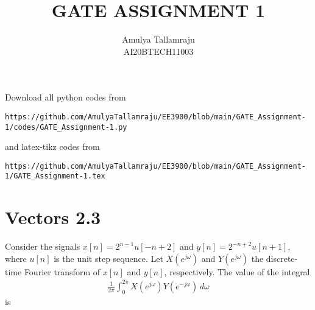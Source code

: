 \documentclass[journal,12pt,twocolumn]{IEEEtran}
\begin{document}
     \def\centbox#1{\makebox[0in]{#1}}
     \def\topbox#1{\raisebox{-\baselineskip}[0in][0in]{#1}}
     \def\midbox#1{\raisebox{-0.5\baselineskip}[0in][0in]{#1}}
\vspace{3cm}
\title{GATE ASSIGNMENT 1}
\author{Amulya Tallamraju \\ AI20BTECH11003}
\maketitle
\newpage
\bigskip
\renewcommand{\thefigure}{\theenumi}
\renewcommand{\thetable}{\theenumi}
Download all python codes from 
\begin{lstlisting}
https://github.com/AmulyaTallamraju/EE3900/blob/main/GATE_Assignment-1/codes/GATE_Assignment-1.py
\end{lstlisting}
%
and latex-tikz codes from 
%
\begin{lstlisting}
https://github.com/AmulyaTallamraju/EE3900/blob/main/GATE_Assignment-1/GATE_Assignment-1.tex
\end{lstlisting}
%
\section{Vectors 2.3}
Consider  the  signals  $x[n]=2^{n-1}u[-n+2]$ and $y[n]=2^{-n+2}u[n+1]$, 
where $u[n]$ is the unit step sequence. Let $X(e^{j\omega})$ and $Y(e^{j\omega})$ the discrete-time  Fourier  transform  of  $x[n]$  and  $y[n]$,  respectively.  The  value  of  the 
integral 
\begin{align}
    \frac{1}{2\pi} \int_{0}^{2\pi} X(e^{j\omega}) Y(e^{-j\omega}) \, d\omega
\end{align}
is
%
\end{document}
